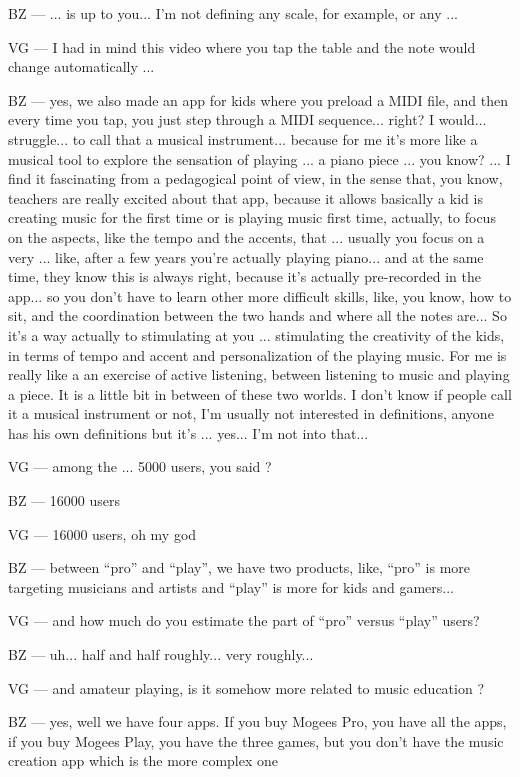 BZ — ... is up to you... I'm not defining any scale, for example, or any ...

VG — I had in mind this video where you tap the table and the note would change automatically ...

BZ — yes, we also made an app for kids where you preload a MIDI file, and then every time you tap, you just step through a MIDI sequence... right? I would... struggle... to call that a musical instrument... because for me it's more like a musical tool to explore the sensation of playing ... a piano piece ... you know? ... I find it fascinating from a pedagogical point of view, in the sense that, you know, teachers are really excited about that app, because it allows basically a kid  is creating music for the first time or is playing music first time, actually, to focus on the aspects, like the tempo and the accents, that ... usually you focus on a very ... like, after a few years you're actually playing piano... and at the same time, they know this is always right, because it's actually pre-recorded in the app... so you don't have to learn other more difficult skills, like, you know, how to sit, and the coordination between the two hands and where all the notes are... So it's a way actually to stimulating at you ... stimulating the creativity of the kids, in terms of tempo and accent and personalization of the playing music. For me is really like a an exercise of active listening, between listening to music and playing a piece. It is a little bit in between of these two worlds. I don't know if people call it a musical instrument or not, I'm usually not interested in definitions, anyone has his own definitions but it's ... yes... I'm not into that...

VG — among the ... 5000 users, you said ?

BZ — 16000 users

VG — 16000 users, oh my god

BZ — between ``pro'' and ``play'', we have two products, like, ``pro'' is more targeting musicians and artists and ``play'' is more for kids and gamers... 

VG — and how much do you estimate the part of ``pro'' versus ``play'' users? 

BZ — uh... half and half roughly... very roughly...

VG — and amateur playing, is it somehow more related to music education ?

BZ —  yes, well we have four apps. If you buy Mogees Pro, you have all the apps, if you buy Mogees Play, you have the three games, but you don't have the music creation app which is the more complex one


